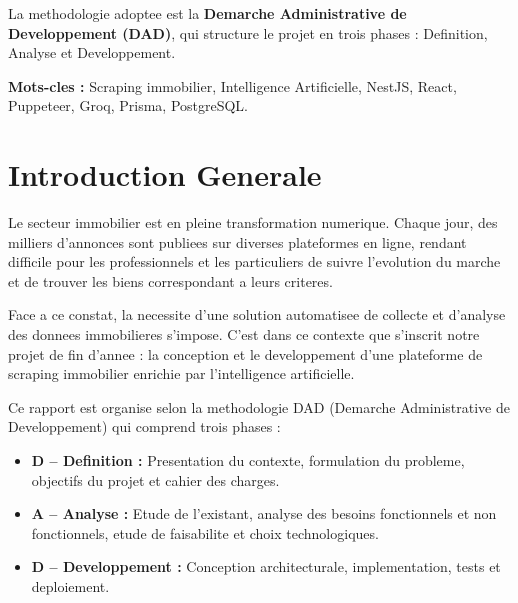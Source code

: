 \documentclass[12pt,a4paper]{report}
\begin{document}
La methodologie adoptee est la \textbf{Demarche Administrative de Developpement (DAD)}, qui structure le projet en trois phases : Definition, Analyse et Developpement.

\textbf{Mots-cles :} Scraping immobilier, Intelligence Artificielle, NestJS, React, Puppeteer, Groq, Prisma, PostgreSQL.

\tableofcontents
\newpage

\listoffigures
\listoftables
\newpage

\chapter*{Introduction Generale}

\vspace*{0.5cm}

Le secteur immobilier est en pleine transformation numerique. Chaque jour, des milliers d'annonces sont publiees sur diverses plateformes en ligne, rendant difficile pour les professionnels et les particuliers de suivre l'evolution du marche et de trouver les biens correspondant a leurs criteres.

Face a ce constat, la necessite d'une solution automatisee de collecte et d'analyse des donnees immobilieres s'impose. C'est dans ce contexte que s'inscrit notre projet de fin d'annee : la conception et le developpement d'une plateforme de scraping immobilier enrichie par l'intelligence artificielle.

Ce rapport est organise selon la methodologie DAD (Demarche Administrative de Developpement) qui comprend trois phases :

\begin{itemize}
  \item \textbf{D -- Definition :} Presentation du contexte, formulation du probleme, objectifs du projet et cahier des charges.
  \item \textbf{A -- Analyse :} Etude de l'existant, analyse des besoins fonctionnels et non fonctionnels, etude de faisabilite et choix technologiques.
  \item \textbf{D -- Developpement :} Conception architecturale, implementation, tests et deploiement.
\end{itemize}
\end{document}
